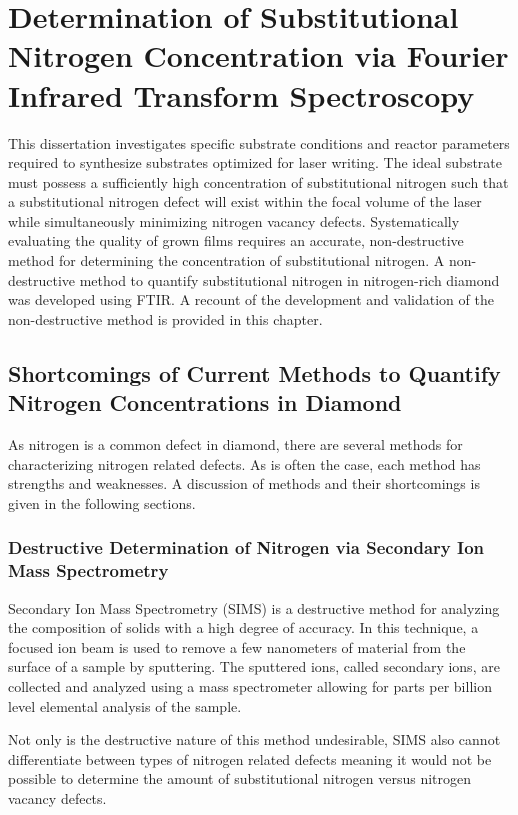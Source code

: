 \chapter{Determination of Substitutional Nitrogen Concentration via Fourier Infrared Transform Spectroscopy}
\label{chFTIRMethod}
\indent

This dissertation investigates specific substrate conditions and reactor parameters required to synthesize substrates optimized for laser writing. The ideal substrate must possess a sufficiently high concentration of substitutional nitrogen such that a substitutional nitrogen defect will exist within the focal volume of the laser while simultaneously minimizing nitrogen vacancy defects. Systematically evaluating the quality of grown films requires an accurate, non-destructive method for determining the concentration of substitutional nitrogen. A non-destructive method to quantify substitutional nitrogen in nitrogen-rich diamond was developed using FTIR. A recount of the development and validation of the non-destructive method is provided in this chapter.

\section{Shortcomings of Current Methods to Quantify Nitrogen Concentrations in Diamond}
\indent

As nitrogen is a common defect in diamond, there are several methods for characterizing nitrogen related defects. As is often the case, each method has strengths and weaknesses. A discussion of methods and their shortcomings is given in the following sections.

\subsection{Destructive Determination of Nitrogen via Secondary Ion Mass Spectrometry}
\indent

Secondary Ion Mass Spectrometry (SIMS) is a destructive method for analyzing the composition of solids with a high degree of accuracy. In this technique, a focused ion beam is used to remove a few nanometers of material from the surface of a sample by sputtering. The sputtered ions, called secondary ions, are collected and analyzed using a mass spectrometer allowing for parts per billion level elemental analysis of the sample.

Not only is the destructive nature of this method undesirable, SIMS also cannot differentiate between types of nitrogen related defects meaning it would not be possible to determine the amount of substitutional nitrogen versus nitrogen vacancy defects.


